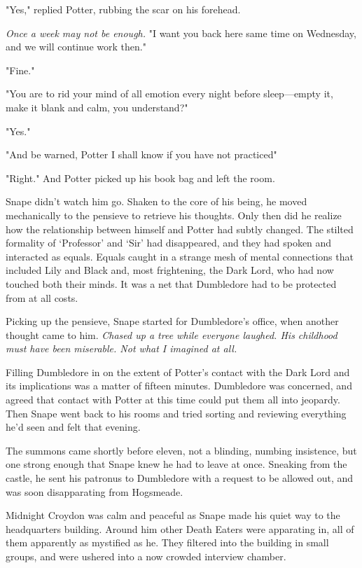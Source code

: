 "Yes," replied Potter, rubbing the scar on his forehead.

\emph{Once a week may not be enough.} "I want you back here same time on Wednesday, and we will continue work then."

"Fine."

"You are to rid your mind of all emotion every night before sleep—empty it, make it blank and calm, you understand?"

"Yes."

"And be warned, Potter{\el} I shall know if you have not practiced{\el}"

"Right." And Potter picked up his book bag and left the room.

Snape didn't watch him go. Shaken to the core of his being, he moved mechanically to the pensieve to retrieve his thoughts. Only then did he realize how the relationship between himself and Potter had subtly changed. The stilted formality of `Professor' and `Sir' had disappeared, and they had spoken and interacted as equals. Equals caught in a strange mesh of mental connections that included Lily and Black and, most frightening, the Dark Lord, who had now touched both their minds. It was a net that Dumbledore had to be protected from at all costs.

Picking up the pensieve, Snape started for Dumbledore's office, when another thought came to him. \emph{Chased up a tree while everyone laughed. His childhood must have been miserable. Not what I imagined at all.}

Filling Dumbledore in on the extent of Potter's contact with the Dark Lord and its implications was a matter of fifteen minutes. Dumbledore was concerned, and agreed that contact with Potter at this time could put them all into jeopardy. Then Snape went back to his rooms and tried sorting and reviewing everything he'd seen and felt that evening.

The summons came shortly before eleven, not a blinding, numbing insistence, but one strong enough that Snape knew he had to leave at once. Sneaking from the castle, he sent his patronus to Dumbledore with a request to be allowed out, and was soon disapparating from Hogsmeade.

Midnight Croydon was calm and peaceful as Snape made his quiet way to the headquarters building. Around him other Death Eaters were apparating in, all of them apparently as mystified as he. They filtered into the building in small groups, and were ushered into a now crowded interview chamber.

